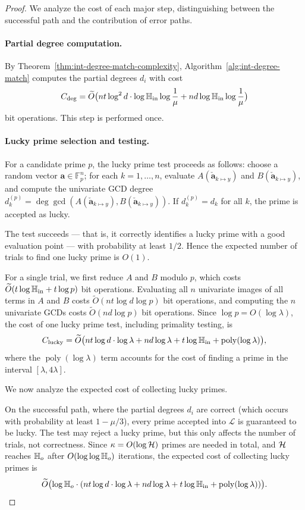 \documentclass{article}
\numberwithin{equation}{section}
\begin{document}
\begin{proof}
We analyze the cost of each major step, distinguishing between the successful path and the contribution of error paths.

\paragraph{Partial degree computation.}
By Theorem~\ref{thm:int-degree-match-complexity}, Algorithm~\ref{alg:int-degree-match} computes the partial degrees $d_i$ with cost
\[
C_{\deg} = \widetilde{O}\bigl( n t \log^2 d \cdot \log \mathbb{H}_{\rm in} \log\frac{1}{\mu} + n d \log \mathbb{H}_{\rm in} \log\frac{1}{\mu} \bigr)
\]
bit operations. This step is performed once.

\paragraph{Lucky prime selection and testing.}
For a candidate prime $p$, the lucky prime test proceeds as follows: choose a random vector $\mathbf{a} \in \mathbb{F}_p^n$; for each $k=1,\dots,n$, evaluate $A(\mathbf{\check{a}}_{k \mapsto y} )$ and $B(\mathbf{\check{a}}_{k \mapsto y} )$, and compute the univariate GCD degree $d_k^{(p)} = \deg \gcd(A(\mathbf{\check{a}}_{k \mapsto y} ), B(\mathbf{\check{a}}_{k \mapsto y} ))$. If $d_k^{(p)} = d_k$ for all $k$, the prime is accepted as lucky.

The test succeeds --- that is, it correctly identifies a lucky prime with a good evaluation point --- with probability at least $1/2$. Hence the expected number of trials to find one lucky prime is $O(1)$.

For a single trial, we first reduce $A$ and $B$ modulo $p$, which costs $\widetilde{O}(t\log \mathbb{H}_{\rm in} + t\log p)$ bit operations. Evaluating all $n$ univariate images of all terms in $A$ and $B$ costs $\widetilde{O}(n t \log d \log p)$ bit operations, and computing the $n$ univariate GCDs costs $\widetilde{O}(n d \log p)$ bit operations. Since $\log p = O(\log \lambda)$, the cost of one lucky prime test, including primality testing, is
\[
C_{\text{lucky}} = \widetilde{O}\bigl( n t \log d \cdot \log \lambda + n d \log \lambda + t\log\mathbb{H}_{\rm in} + \operatorname{poly}(\log \lambda) \bigr),
\]
where the $\operatorname{poly}(\log \lambda)$ term accounts for the cost of finding a prime in the interval $[\lambda, 4\lambda]$.

We now analyze the expected cost of collecting lucky primes.

On the successful path, where the partial degrees $d_i$ are correct (which occurs with probability at least $1 - \mu/3$), every prime accepted into $\mathcal{L}$ is guaranteed to be lucky. The test may reject a lucky prime, but this only affects the number of trials, not correctness. Since $\kappa = O(\log {\mathcal{H}})$ primes are needed in total, and ${\mathcal{H}}$ reaches $\mathbb{H}_{o}$ after $O(\log\log \mathbb{H}_{o})$ iterations, the expected cost of collecting lucky primes is
\[
\widetilde{O}\bigl( \log \mathbb{H}_{o} \cdot (n t \log d \cdot \log \lambda + n d \log \lambda + t\log\mathbb{H}_{\rm in}+\operatorname{poly}(\log \lambda)) \bigr).
\]


\end{proof}
\end{document}
